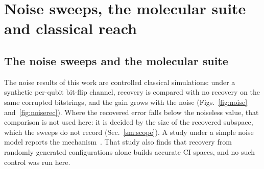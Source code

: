 
\section{Noise sweeps, the molecular suite and classical reach}
\label{sm:noisemol}

\subsection{The noise sweeps and the molecular suite}
\label{sec:scope:hw}

The noise results of this work are controlled classical simulations: under a synthetic per-qubit
bit-flip channel, recovery is compared with no recovery on the same corrupted bitstrings, and the gain
grows with the noise (Figs.~\ref{fig:noise} and~\ref{fig:noiserec}). Where the recovered error falls
below the noiseless value, that comparison is not used here: it is decided by the size of the
recovered subspace, which the sweeps do not record (Sec.~\ref{sm:scope}). A study under a simple
noise model reports the mechanism~\cite{vaquero2026}. That study also finds that recovery from
randomly generated configurations alone builds accurate CI spaces, and no such control was run here.




